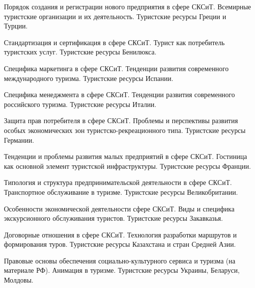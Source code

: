 \documentclass[
	11pt,
	a4paper,
	]
	{article}
\begin{document}
\bigskip

\noindent{} 
	{
		Порядок создания и регистрации нового предприятия в сфере СКСиТ.
	}{
		Всемирные туристские организации и их деятельность.
	}{
		Туристские ресурсы Греции и Турции.
	}

\bigskip

\noindent{} 
	{
		Стандартизация и сертификация в сфере СКСиТ.
	}{
		Турист как потребитель туристских услуг.
	}{
		Туристские ресурсы Бенилюкса.
	}

\bigskip

\noindent{} 
	{
		Специфика маркетинга в сфере СКСиТ.
	}{
		Тенденции развития современного международного туризма.
	}{
		Туристские ресурсы Испании.
	}

\bigskip

\noindent{} 
	{
		Специфика менеджмента в сфере СКСиТ.
	}{
		Тенденции развития современного российского туризма.
	}{
		Туристские ресурсы Италии.
	}

\bigskip

\noindent{} 
	{
		Защита прав потребителя в сфере СКСиТ.
	}{
		Проблемы и перспективы развития особых экономических зон туристско-рекреационного типа.
	}{
		Туристские ресурсы Германии.
	}

\bigskip

\noindent{} 
	{
		Тенденции и проблемы развития малых предприятий в сфере СКСиТ.
	}{
		Гостиница как основной элемент туристской инфраструктуры.
	}{
		Туристские ресурсы Франции.
	}

\bigskip

\noindent{} 
	{
		Типология и структура предпринимательской деятельности в сфере СКСиТ.
	}{
		Транспортное обслуживание в туризме.
	}{
		Туристские ресурсы Великобритании.
	}

\bigskip

\noindent{} 
	{
		Особенности экономической деятельности сфере СКСиТ.
	}{
		Виды и специфика экскурсионного обслуживания туристов.
	}{
		Туристские ресурсы Закавказья.
	}

\bigskip

\noindent{} 
	{
		Договорные отношения в сфере СКСиТ.
	}{
		Технология разработки маршрутов и формирования туров.
	}{
		Туристские ресурсы Казахстана и стран Средней Азии.
	}

\bigskip

\noindent{} 
	{
		Правовые основы обеспечения социально-культурного сервиса и туризма (на материале РФ).
	}{
		Анимация в туризме.
	}{
		Туристские ресурсы Украины, Беларуси, Молдовы.
	}
\end{document}
